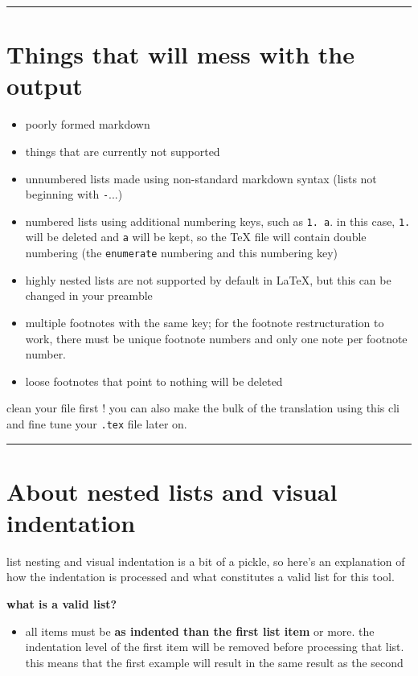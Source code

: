 \documentclass[a4paper, 12pt, twoside]{book}
\begin{document}
\par\noindent\rule{\linewidth}{0.4pt}
\section*{Things that will mess with the output}

\begin{itemize}
\item poorly formed markdown
\item things that are currently not supported
\item unnumbered lists made using non-standard markdown syntax (lists not beginning with \texttt{-}...)
\item numbered lists using additional numbering keys, such as \texttt{1. a}. in this case, \texttt{1.} will be deleted and \texttt{a} will be kept, so the TeX file will contain double numbering (the \texttt{enumerate} numbering and this numbering key)
\item highly nested lists are not supported by default in LaTeX, but this can be changed in your preamble
\item multiple footnotes with the same key; for the footnote restructuration to work, there must be unique footnote numbers and only one note per footnote number.
\item loose footnotes that point to nothing will be deleted 
\end{itemize}

clean your file first ! you can also make the bulk of the translation using this cli and fine tune your \texttt{.tex} 
file later on.

\par\noindent\rule{\linewidth}{0.4pt}
\section*{About nested lists and visual indentation}

list nesting and visual indentation is a bit of a pickle, so here's an explanation of how
the indentation is processed and what constitutes a valid list for this tool.

\textbf{what is a valid list?}

\begin{itemize}
\item all items must be \textbf{as indented than the first list item} or more. the indentation level of the first item will be removed before processing that list. this means that the first example will result in the same result as the second 
\end{itemize}
\end{document}
